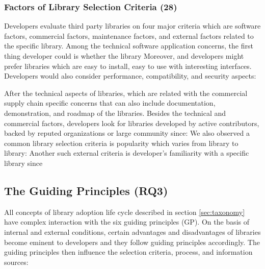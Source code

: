 \subsubsection{Factors of Library Selection Criteria (28)}
Developers evaluate third party libraries on four major criteria which are software factors, commercial factors, maintenance factors, and external factors related to the specific library. Among the technical software application concerns, the first thing developer could is whether the library  Moreover,  and developers might prefer libraries which are easy to install, easy to use with interesting interfaces. Developers would also consider performance, compatibility, and security aspects: 

After the technical aspects of libraries,  which are related with the commercial supply chain specific concerns that can also include documentation, demonstration, and roadmap of the libraries. Besides the technical and commercial factors, developers look for libraries developed by active contributors, backed by reputed organizations or large community since:  We also observed a common library selection criteria is popularity which varies from library to library:  Another such external criteria is developer's familiarity with a specific library since  


\subsection{The Guiding Principles (RQ3)}
\label{sec:gp}

All concepts of library adoption life cycle described in section \ref{sec:taxonomy} have complex interaction with the six guiding principles (GP). On the basis of internal and external conditions, certain advantages and disadvantages of libraries become eminent to developers and they follow guiding principles accordingly. The guiding principles then influence the selection criteria, process, and information sources:  

